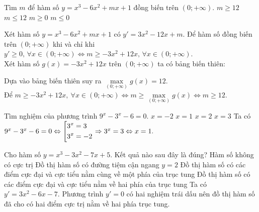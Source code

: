 \begin{ex}%
Tìm $ m $ để hàm số $ y = x^3 - 6x^2 + mx + 1 $ đồng biến trên $ (0;+\infty) $.
\choice
{\True $ m \ge 12 $}
{$ m \le 12 $}
{$ m \ge 0 $}
{$ m \le 0 $}
\loigiai
	{
Xét hàm số 	$ y = x^3 - 6x^2 + mx + 1 $ có $ y' = 3x^2 - 12x + m $.
Để hàm số đồng biến trên $ (0;+\infty) $ khi và chỉ khi $ y' \ge 0 , \, \forall x \in (0;+\infty) \Leftrightarrow m \ge -3x^2 + 12x, \, \forall x \in (0;+\infty)$.\\
Xét hàm số $ g(x) = -3x^2 + 12x $	trên $ (0;+\infty) $ ta có bảng biến thiên:
\begin{center}
\end{center}
Dựa vào bảng biến thiên suy ra $ \max \limits_{(0;+\infty)} g(x) = 12 $.\\
Để $ m \ge -3x^2 + 12x,\ \forall x \in \left(0; + \infty\right) \Leftrightarrow m \ge \max \limits_{(0;+\infty)} g(x) \Leftrightarrow m \ge 12.$
	}
\end{ex}
\begin{ex}%
Tìm nghiệm của phương trình $ 9^x - 3^x - 6 = 0. $
\choice
{ $x = -2$ }
{\True  $x = 1$ }
{ $x = 2$ }
{ $x = 3$ }
	\loigiai
	{Ta có $ 9^x - 3^x - 6 = 0 \Leftrightarrow \left[\begin{aligned}&3^x = 3 \\ &3^x = -2\end{aligned}\right. \Rightarrow 3^x = 3 \Leftrightarrow x = 1. $
	}
\end{ex}
\begin{ex}%
Cho hàm số $ y = x^3 - 3x^2 - 7x + 5 $. Kết quả nào sau đây là đúng?
\choice
{Hàm số không có cực trị}
{Đồ thị hàm số có đường tiệm cận ngang $ y = 2 $}
{Đồ thị hàm số có các điểm cực đại và cực tiểu nằm cùng về một phía của trục tung}
{\True Đồ thị hàm số có các điểm cực đại và cực tiểu nằm về hai phía của trục tung}
	\loigiai
	{Ta có $ y' = 3x^2 - 6x - 7. $ Phương trình $ y' = 0 $ có hai nghiệm trái dấu nên đồ thị hàm số đã cho có hai điểm cực trị nằm về hai phía trục tung.
	}
\end{ex}
